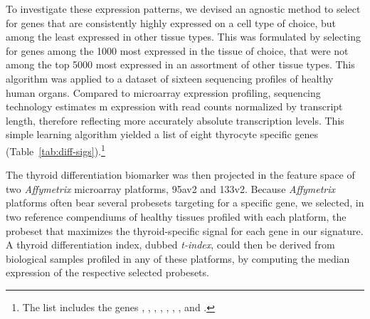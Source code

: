 To investigate these expression patterns, we devised an agnostic method to
select for genes that are consistently highly expressed on a cell type of
choice, but among the least expressed in other tissue types.  This was
formulated by selecting for genes among the \num{1000} most expressed in the
tissue of choice, that were not among the top \num{5000} most expressed in an
assortment of other tissue types.  This algorithm was applied to a dataset of
sixteen  sequencing profiles of healthy human
organs.\cite{bodymap_2.0_2012} Compared to microarray expression profiling,
 sequencing technology estimates m expression with
read counts normalized by transcript length, therefore reflecting more
accurately absolute transcription levels.\cite{wang_rna-seq:_2009} This simple
learning algorithm yielded a list of eight thyrocyte specific genes
(Table~\ref{tab:diff-sigs}).\footnote{The list includes the genes
  , , ,
  , , ,
  , and .}


The thyroid differentiation biomarker was then projected in the feature space of
two \emph{Affymetrix} microarray platforms, 95av2 and
133v2.  Because \emph{Affymetrix} platforms often bear several
probesets targeting for a specific gene, we selected, in two reference
compendiums of healthy tissues profiled with each platform, the probeset that
maximizes the thyroid-specific signal for each gene in our signature.  A thyroid
differentiation index, dubbed \emph{\mbox{t-index}}, could then be derived from
biological samples profiled in any of these platforms, by computing the median
expression of the respective selected probesets.

